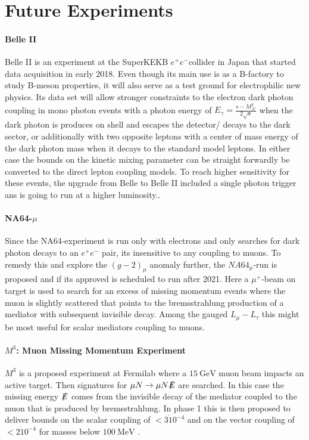 \section{Future Experiments}
\paragraph{Belle II}
Belle II is an experiment at the SuperKEKB $e^+e^-$collider in Japan that started data acquisition in early 2018. Even though its main use is as a B-factory to study B-meson properties, it will also serve as a test ground for electrophilic new physics. Its data set will allow stronger constraints to the electron dark photon coupling in mono photon events with a photon energy of $E_\gamma = \frac{s-M_{A'}^2}{2\sqrt{s}}$ when the dark photon is produces on shell and escapes the detector/ decays to the dark sector, or additionally with two opposite leptons with a center of mass energy of the dark photon mass when it decays to the standard model leptons. 
In either case the bounds on the kinetic mixing parameter can be straight forwardly be converted to the direct lepton coupling models. To reach higher sensitivity for these events, the upgrade from Belle to Belle II included a single photon trigger ans is going to run at a higher luminosity.\cite{Inguglia:2016acz}.  
\paragraph{NA64-\texorpdfstring{$\mu$}{mu}}
Since the NA64-experiment is run only with electrons and only searches for dark photon decays to an $e^+e^-$ pair, its insensitive to any coupling to muons. To remedy this and explore the $(g-2)_\mu$ anomaly further, the $NA64_\mu$-run is proposed and if its approved is scheduled to run after 2021. Here a $\mu^+$-beam on target is used to search for an excess of missing momentum events where the muon is slightly scattered that points to the bremsstrahlung production of a mediator with subsequent invisible decay. Among the gauged $L_\mu-L_\tau$ this might be most useful for scalar mediators coupling to muons.
\paragraph{$M^3$: Muon Missing Momentum Experiment}
$M^3$ is a proposed experiment at Fermilab where a $\SI{15}{\giga \eV}$ muon beam impacts an active target. Then signatures for $\mu N \rightarrow \mu N \slashed{E}$ are searched. In this case the missing energy $\slashed{E}$ comes from the invisible decay of the mediator coupled to the muon that is produced by bremsstrahlung. In phase 1 this is then proposed to deliver bounds on the scalar coupling of $<3\dot10^{-4}$ and on the vector coupling of  $<2\dot10^{-4}$ for masses below $\SI{100}{\mega \eV}$ \cite{Kahn:2018cqs}.